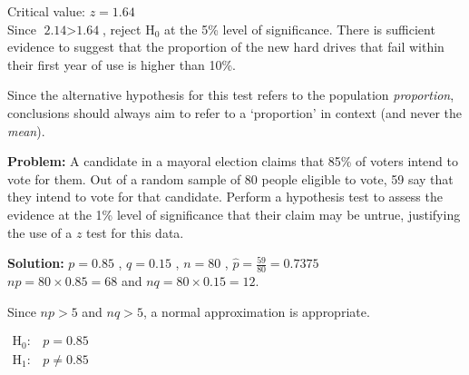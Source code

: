 \documentclass[
  11pt,
]{book}
\begin{document}
\begin{tcolorbox}[title=Example,colback=RoyalBlue!1!,colframe=RoyalBlue]
Critical value: $z=\text{1.64}$\\


Since $\text{2.14}>\text{1.64}$, reject $\text{H}_\text{0}$ at the 5\% level of significance. There is sufficient evidence to suggest that the proportion of the new hard drives that fail within their first year of use is higher than 10\%.

\end{tcolorbox}

Since the alternative hypothesis for this test refers to the population \emph{proportion}, conclusions should always aim to refer to a `proportion' in context (and never the \emph{mean}).

\begin{tcolorbox}[title=Example,colback=RoyalBlue!1!,colframe=RoyalBlue]
\textbf{Problem:} A candidate in a mayoral election claims that 85\% of voters intend to vote for them. Out of a random sample of 80 people eligible to vote, 59 say that they intend to vote for that candidate. Perform a hypothesis test to assess the evidence at the 1\% level of significance that their claim may be untrue, justifying the use of a $z$ test for this data.

\tcblower
\textbf{Solution:}
$p=\text{0.85}$ , $q=\text{0.15}$ , $n=\text{80}$ , $\hat{p}=\frac{\text{59}}{\text{80}}=\text{0.7375}$\\

$np=\text{80}\times \text{0.85}=\text{68}$ and $nq=\text{80}\times \text{0.15}=\text{12}$.

Since $np>\text{5}$ and $nq>\text{5}$, a normal approximation is appropriate.\\

\vspace{0.2cm}

\begin{math}
\begin{array}{ll}
      \text{H}_\text{0}: & p=\text{0.85}\\
      \text{H}_\text{1}: & p\ne \text{0.85}
    \end{array}
\end{math}\\

\vspace{0.2cm}


\end{tcolorbox}
\end{document}
